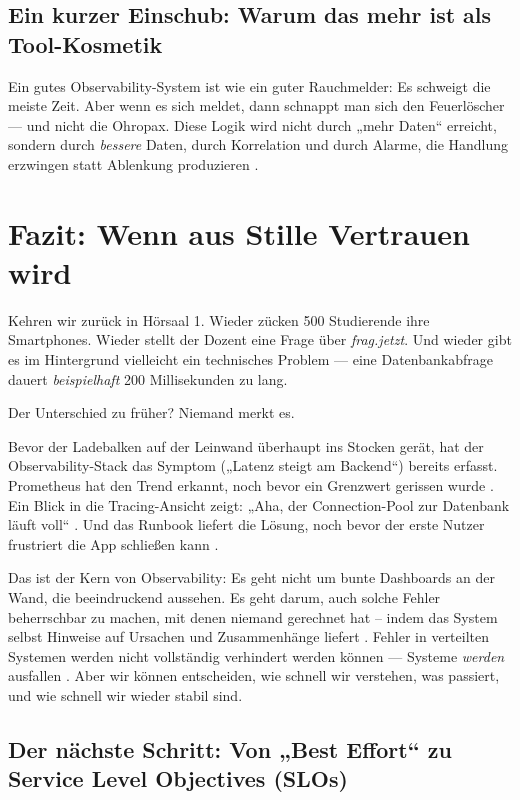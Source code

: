 \subsection{Ein kurzer Einschub: Warum das mehr ist als Tool-Kosmetik}

Ein gutes Observability-System ist wie ein guter Rauchmelder: Es schweigt die meiste Zeit. Aber wenn es sich meldet, dann schnappt man sich den Feuerlöscher --- und nicht die Ohropax. Diese Logik wird nicht durch „mehr Daten“ erreicht, sondern durch \emph{bessere} Daten, durch Korrelation und durch Alarme, die Handlung erzwingen statt Ablenkung produzieren \cite{gowda2022alertsAutomation} \cite{jalalvand2024alert}.

\section{Fazit: Wenn aus Stille Vertrauen wird}

Kehren wir zurück in Hörsaal 1. Wieder zücken 500 Studierende ihre Smartphones. Wieder stellt der Dozent eine Frage über \emph{frag.jetzt}. Und wieder gibt es im Hintergrund vielleicht ein technisches Problem --- eine Datenbankabfrage dauert \emph{beispielhaft} 200 Millisekunden zu lang.

Der Unterschied zu früher? Niemand merkt es.

Bevor der Ladebalken auf der Leinwand überhaupt ins Stocken gerät, hat der Observability-Stack das Symptom („Latenz steigt am Backend“) bereits erfasst. Prometheus hat den Trend erkannt, noch bevor ein Grenzwert gerissen wurde \cite{banerjee2024comparative}. Ein Blick in die Tracing-Ansicht zeigt: „Aha, der Connection-Pool zur Datenbank läuft voll“ \cite{albuquerque2025tracing}. Und das Runbook liefert die Lösung, noch bevor der erste Nutzer frustriert die App schließen kann \cite{gowda2022alertsAutomation}.

Das ist der Kern von Observability: Es geht nicht um bunte Dashboards an der Wand, die beeindruckend aussehen. Es geht darum, auch solche Fehler beherrschbar zu machen, mit denen niemand gerechnet hat – indem das System selbst Hinweise auf Ursachen und Zusammenhänge liefert \cite{abieba2025advanced}. Fehler in verteilten Systemen werden nicht vollständig verhindert werden können --- Systeme \emph{werden} ausfallen \cite{ewaschukMonitoringDistributedSystems}. Aber wir können entscheiden, wie schnell wir verstehen, was passiert, und wie schnell wir wieder stabil sind.

\subsection{Der nächste Schritt: Von „Best Effort“ zu Service Level Objectives (SLOs)}

